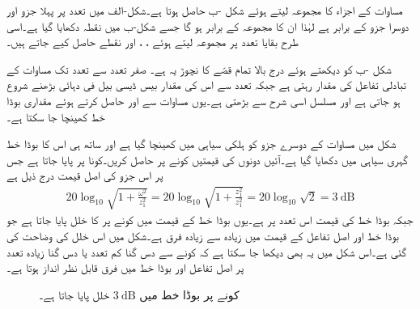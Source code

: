 مساوات  کے اجزاء کا مجموعہ لیتے ہوئے شکل -ب حاصل ہوتا ہے۔شکل-الف میں  تعدد پر پہلا جزو  اور دوسرا جزو  کے برابر ہے لہٰذا ان کا مجموعہ  کے برابر ہو گا جسے شکل-ب میں نقطہ  دکھایا گیا ہے۔اسی طرح بقایا تعدد پر مجموعہ لیتے ہوئے ، ،  اور  نقطے حاصل کیے جاتے ہیں۔

شکل -ب کو دیکھتے ہوئے درج بالا تمام قصّے کا نچوڑ یہ ہے۔ صفر تعدد سے   تعدد تک مساوات  کے تبادلی تفاعل کی مقدار  رہتی ہے جبکہ  تعدد سے اس کی مقدار بیس ڈیسی بیل فی دہائی بڑھنے شروع ہو جاتی ہے اور مسلسل اسی شرح سے بڑھتی ہے۔یوں مساوات  سے  اور  حاصل کرتے ہوئے  مقداری بوڈا خط کھینچا جا سکتا ہے۔

شکل  میں مساوات  کے دوسرے جزو  کو ہلکی سیاہی میں کھینچا گیا ہے اور ساتھ ہی اس کا بوڈا خط گہری سیاہی میں دکھایا گیا ہے۔آئیں دونوں کی قیمتیں کونے پر حاصل کریں۔کونا  پر پایا جاتا ہے جس پر اس  جزو کی اصل قیمت درج ذیل ہے
\begin{align}
20\log_{10} \sqrt{1+\frac{\omega^2}{z_1^2}}=20\log_{10}\sqrt{1+\frac{z_1^2}{z_1^2}}=20\log_{10}\sqrt{2}=\SI{3}{\deci\bel}
\end{align}
جبکہ بوڈا خط کی قیمت اس تعدد پر  ہے۔یوں بوڈا خط کے قیمت میں کونے پر  کا خلل پایا جاتا ہے جو بوڈا خط اور اصل تفاعل کے قیمت میں زیادہ سے زیادہ فرق ہے۔شکل  میں اس خلل کی وضاحت کی گئی ہے۔اس شکل میں یہ بھی دیکھا جا سکتا ہے کہ کونے سے دس گنا کم تعدد  یا دس گنا زیادہ تعدد  پر اصل تفاعل اور بوڈا خط میں فرق قابل نظر انداز ہوتا ہے۔
\begin{figure}
\centering
{}
\caption{کونے پر بوڈا خط میں $\SI{3}{\deci\bel}$ خلل پایا جاتا ہے۔}
\label{شکل_تعددی_بوڈا_تین_ڈیسی_بیل_خلل}
\end{figure}


